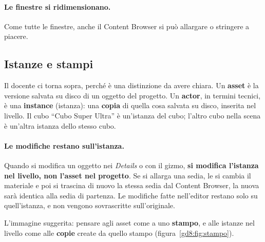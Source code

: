 \paragraph{Le finestre si ridimensionano.} Come tutte le finestre, anche il
Content Browser si può allargare o stringere a piacere.

\subsection{Istanze e stampi}

Il docente ci torna sopra, perché è una distinzione da avere chiara. Un
\textbf{asset} è la versione salvata su disco di un oggetto del progetto. Un
\textbf{actor}, in termini tecnici, è una \textbf{instance} (istanza): una
\textbf{copia} di quella cosa salvata su disco, inserita nel livello. Il cubo
``Cubo Super Ultra'' è un'istanza del cubo; l'altro cubo nella scena è
un'altra istanza dello stesso cubo.

\paragraph{Le modifiche restano sull'istanza.} Quando si modifica un oggetto
nei \emph{Details} o con il gizmo, \textbf{si modifica l'istanza nel livello,
non l'asset nel progetto}. Se si allarga una sedia, le si cambia il materiale
e poi si trascina di nuovo la stessa sedia dal Content Browser, la nuova sarà
identica alla sedia di partenza. Le modifiche fatte nell'editor restano solo
su quell'istanza, e non vengono sovrascritte sull'originale.

L'immagine suggerita: pensare agli asset come a uno \textbf{stampo}, e alle
istanze nel livello come alle \textbf{copie} create da quello stampo
(figura~\ref{gd8:fig:stampo}).


